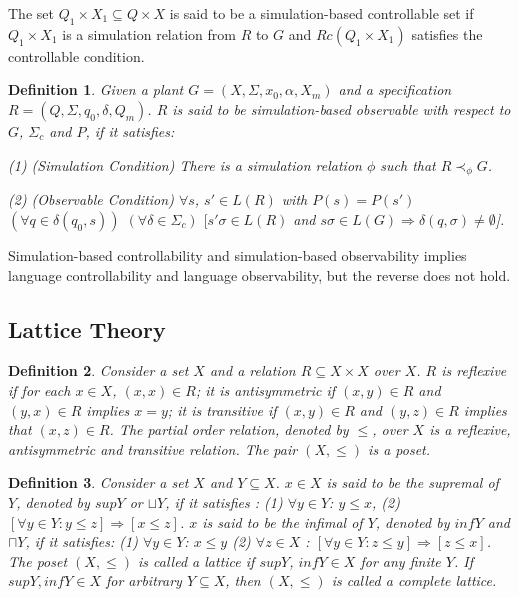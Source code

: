 \documentclass[12pt,draftcls,onecolumn]{IEEEtran}
\newtheorem{Definition}{Definition}
\begin{document}
The set $Q_1 \times X_1 \subseteq Q \times X$ is said to be a
simulation-based controllable set if $Q_1 \times X_1$ is a
simulation relation from $R$ to $G$ and $Rc(Q_1 \times X_1)$
satisfies the controllable condition.

\begin{Definition}
Given a plant $G =(X,\Sigma,x_{0},\alpha,X_{m})$ and a
specification $R =(Q,\Sigma,q_{0},\delta,Q_{m})$. $R$ is said to
be simulation-based observable with respect to $G$, $\Sigma_{c}$
and $P$, if it satisfies:

(1) (Simulation Condition) There is a simulation relation $\phi$
such that $R \prec_{\phi} G$.

(2) (Observable Condition) $\forall s$, $s' \in L(R)$ with $P(s) =
P(s')$ $(\forall q \in \delta(q_0, s))$ $(\forall \delta \in
\Sigma_{c})$ $[s'\sigma \in L(R)$ and $s\sigma \in L(G) \Rightarrow
\delta(q, \sigma) \neq \emptyset$].
\end{Definition}

Simulation-based controllability and simulation-based
observability implies language controllability and language
observability, but the reverse does not hold.

\subsection{Lattice Theory}






\begin{Definition}
Consider a set $X$ and a relation $R \subseteq X \times X$ over $X$.
$R$ is reflexive if for each $x \in X$, $(x, x) \in R$; it is
antisymmetric if $(x, y) \in R$ and $(y, x) \in R$ implies $x=y$; it
is transitive if $(x, y) \in R$ and $(y, z) \in R$ implies that $(x,
z) \in R$. The partial order relation, denoted by $\leq$, over $X$
is a reflexive, antisymmetric and transitive relation. The pair $(X,
\leq)$ is a poset.
\end{Definition}

\begin{Definition}
Consider a set $X$ and $Y \subseteq X$. $x \in X$ is said to be the
supremal of $Y$, denoted by $supY$ or $\sqcup Y$, if it satisfies :
(1) $\forall y \in Y$: $y \leq x$, (2) $[\forall y \in Y : y \leq z]
\Rightarrow [x \leq z]$. $x$ is said to be the infimal of $Y$,
denoted by $infY$ and $\sqcap Y$, if it satisfies: (1) $\forall y
\in Y$: $x \leq y$ (2) $\forall z \in X$ : $[\forall y \in Y : z
\leq y] \Rightarrow [z \leq x]$. The poset $(X, \leq)$ is called a
lattice if $supY$, $infY \in X$ for any finite $Y$. If $supY, infY
\in X$ for arbitrary $Y \subseteq X$, then $(X, \leq)$ is called a
complete lattice.
\end{Definition}
\end{document}
